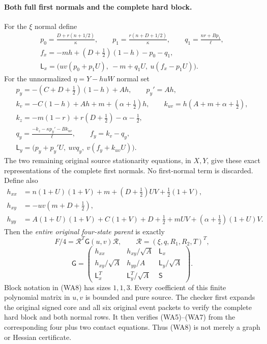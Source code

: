 \paragraph{Both full first normals and the complete hard block.}
For the $\xi$ normal define
\[
 \begin{gathered}
 p_0=\frac{D+r(n+1/2)}\kappa,\qquad
 p_1=\frac{r(n+D+1/2)}\kappa,\qquad
 q_1=\frac{nr+Bp_1}\ell,\\
 f_x=-mh+(D+\tfrac12)(1-h)-p_0-q_1,\\
 \mathsf L_x=\bigl(uv(p_0+p_1U),\ -m+q_1U,\
                                u(f_x-p_1U)\bigr).
 \end{gathered}                                        \tag{WA6}
\]
For the unnormalized $\eta=Y-huW$ normal set
\[
 \begin{gathered}
 p_y=-(C+D+\tfrac12)(1-h)+Ah,\qquad p_y'=Ah,\\
 k_v=-C(1-h)+Ah+m+(\alpha+\tfrac12)h,\qquad
 k_{uv}=h(A+m+\alpha+\tfrac12),\\
 k_z=-m(1-r)+r(D+\tfrac12)-\alpha-\tfrac12,\\
 q_y=\frac{-k_z-\kappa p_y'-Bk_{uv}}\ell,\qquad
 f_y=k_v-q_y,\\
 \mathsf L_y=\bigl(p_y+p_y'U,\ uvq_y,\
                                      v(f_y+k_{uv}U)\bigr).
 \end{gathered}                                        \tag{WA7}
\]
The two remaining original source stationarity equations, in $X,Y$,
give these exact representations of the complete first normals.
No first-normal term is discarded. Define also
\[
 \begin{split}
 h_{xx}&=n(1+U)(1+V)+m+(D+\tfrac12)UV+\tfrac12(1+V),\\
 h_{xy}&=-uv(m+D+\tfrac12),\\
 h_{yy}&=A(1+U)(1+V)+C(1+V)+D+\tfrac12
                   +mUV+(\alpha+\tfrac12)(1+U)V.
 \end{split}
\]
Then the \emph{entire original four-state parent} is exactly
\[
 F/4=\mathcal R^T\mathsf G(u,v)\mathcal R,\qquad
 \mathcal R=(\xi,q,R_1,R_2,T)^T,
\]
\[
 \mathsf G=
 \begin{pmatrix}
 h_{xx}&h_{xy}/\sqrt A&\mathsf L_x\\
 h_{xy}/\sqrt A&h_{yy}/A&\mathsf L_y/\sqrt A\\
 \mathsf L_x^T&\mathsf L_y^T/\sqrt A&\mathsf S
 \end{pmatrix}.                                       \tag{WA8}
\]
Block notation in (WA8) has sizes $1,1,3$. Every coefficient of
this finite polynomial matrix in $u,v$ is bounded and pure source.
The checker first expands the original signed core and all six
original event packets to verify the complete hard block and both
normal rows. It then verifies (WA5)--(WA7) from the corresponding
four plus two contact equations. Thus (WA8) is not merely a graph
or Hessian certificate.

